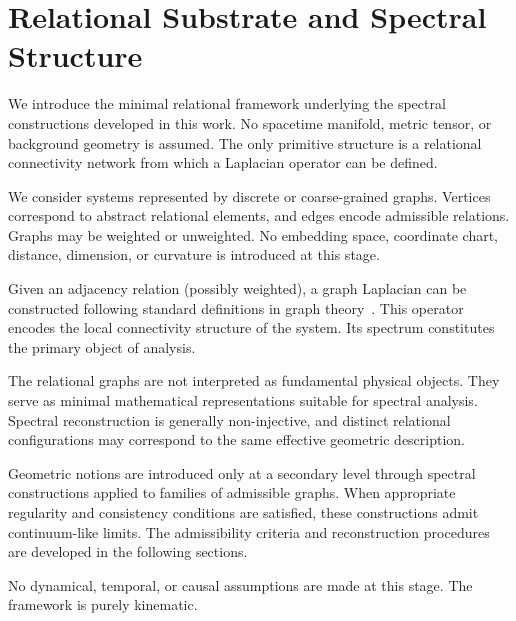 \section{Relational Substrate and Spectral Structure}
  \label{sec:relational-substrate-and-spectral-structure}

  We introduce the minimal relational framework underlying the spectral
  constructions developed in this work.
  No spacetime manifold, metric tensor, or background geometry is assumed.
  The only primitive structure is a relational connectivity network from which
  a Laplacian operator can be defined.

  We consider systems represented by discrete or coarse-grained graphs.
  Vertices correspond to abstract relational elements, and edges encode
  admissible relations.
  Graphs may be weighted or unweighted.
  No embedding space, coordinate chart, distance, dimension, or curvature is
  introduced at this stage.

  Given an adjacency relation (possibly weighted), a graph Laplacian can be
  constructed following standard definitions in graph theory~\cite{Diestel2017,Newman2010}.
  This operator encodes the local connectivity structure of the system.
  Its spectrum constitutes the primary object of analysis.

  The relational graphs are not interpreted as fundamental physical objects.
  They serve as minimal mathematical representations suitable for spectral
  analysis.
  Spectral reconstruction is generally non-injective, and distinct relational
  configurations may correspond to the same effective geometric description.

  Geometric notions are introduced only at a secondary level through spectral
  constructions applied to families of admissible graphs.
  When appropriate regularity and consistency conditions are satisfied,
  these constructions admit continuum-like limits.
  The admissibility criteria and reconstruction procedures are developed
  in the following sections.

  No dynamical, temporal, or causal assumptions are made at this stage.
  The framework is purely kinematic.

  
